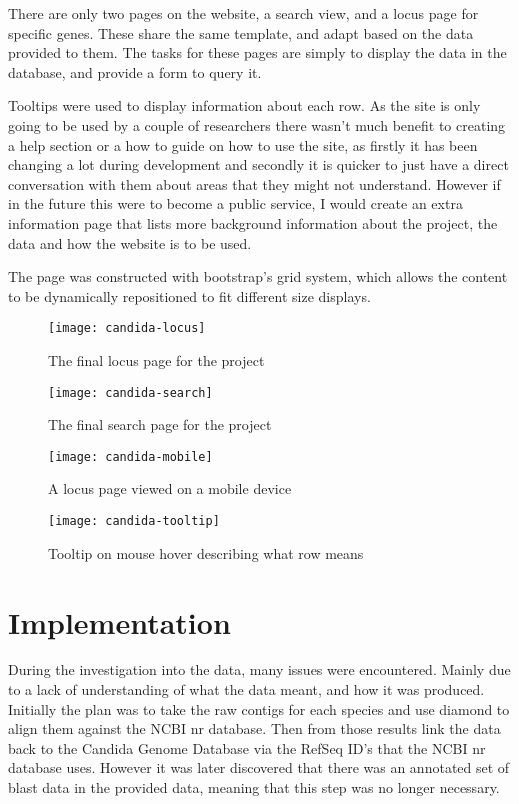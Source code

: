 {There are only two pages on the website, a search view, and a locus page for specific genes. These share the same template, and adapt based on the data provided to them. The tasks for these pages are simply to display the data in the database, and provide a form to query it.

Tooltips were used to display information about each row. As the site is only going to be used by a couple of researchers there wasn't much benefit to creating a help section or a how to guide on how to use the site, as firstly it has been changing a lot during development and secondly it is quicker to just have a direct conversation with them about areas that they might not understand. However if in the future this were to become a public service, I would create an extra information page that lists more background information about the project, the data and how the website is to be used. 

The page was constructed with bootstrap's\cite{bootstrap} grid system, which allows the content to be dynamically repositioned to fit different size displays.

\begin{figure}[H]
\begin{center}
\texttt{[image: candida-locus]}
\caption{The final locus page for the project}
\end{center}
\end{figure}

\begin{figure}[H]
\begin{center}
\texttt{[image: candida-search]}
\caption{The final search page for the project}
\end{center}
\end{figure}

\begin{figure}[H]
\begin{center}
\texttt{[image: candida-mobile]}
\caption{A locus page viewed on a mobile device}
\end{center}
\end{figure}

\begin{figure}[H]
\begin{center}
\texttt{[image: candida-tooltip]}
\caption{Tooltip on mouse hover describing what row means}
\end{center}
\end{figure}

\section{Implementation}
During the investigation into the data, many issues were encountered. Mainly due to a lack of understanding of what the data meant, and how it was produced. Initially the plan was to take the raw contigs for each species and use diamond to align them against the NCBI nr database. Then from those results link the data back to the Candida Genome Database via the RefSeq ID's that the NCBI nr database uses. However it was later discovered that there was an annotated set of blast data in the provided data, meaning that this step was no longer necessary.

}
